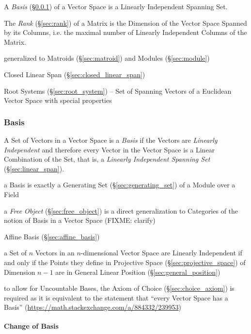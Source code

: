 A \emph{Basis} (\S\ref{sec:basis}) of a Vector Space is a Linearly Independent
Spanning Set.

The \emph{Rank} (\S\ref{sec:rank}) of a Matrix is the Dimension of the Vector
Space Spanned by its Columns, i.e. the maximal number of Linearly Independent
Columns of the Matrix.

generalized to Matroids (\S\ref{sec:matroid}) and Modules (\S\ref{sec:module})

Closed Linear Span (\S\ref{sec:closed_linear_span})

\fist Root Systems (\S\ref{sec:root_system}) -- Set of Spanning Vectors of a
Euclidean Vector Space with special properties



\subsubsection{Basis}\label{sec:basis}

A Set of Vectors in a Vector Space is a \emph{Basis} if the Vectors are
\emph{Linearly Independent} and therefore every Vector in the Vector Space is a
Linear Combination of the Set, that is, a \emph{Linearly Independent Spanning
  Set} (\S\ref{sec:linear_span}).

a Basis is exactly a Generating Set (\S\ref{sec:generating_set}) of a Module
over a Field

\fist a \emph{Free Object} (\S\ref{sec:free_object}) is a direct generalization
to Categories of the notion of Basis in a Vector Space
(FIXME: clarify)

\fist Affine Basis (\S\ref{sec:affine_basis})

a Set of $n$ Vectors in an $n$-dimensional Vector Space are Linearly
Independent if and only if the Points they define in Projective Space
(\S\ref{sec:projective_space}) of Dimension $n-1$ are in General Linear
Position (\S\ref{sec:general_position})

to allow for Uncountable Bases, the Axiom of Choice
(\S\ref{sec:choice_axiom}) is required as it is equivalent to the statement
that ``every Vector Space has a Basis''
(\url{https://math.stackexchange.com/a/884332/239953})



\paragraph{Change of Basis}\label{sec:change_of_basis}\hfill

